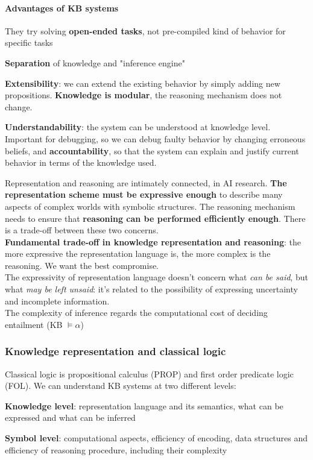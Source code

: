 \documentclass[10pt]{report}
\begin{document}
\paragraph{Advantages of KB systems}
\begin{list}{}{}
	\item They try solving \textbf{open-ended tasks}, not pre-compiled kind of behavior for specific tasks
	\item \textbf{Separation} of knowledge and "inference engine"
	\item \textbf{Extensibility}: we can extend the existing behavior by simply adding new propositions. \textbf{Knowledge is modular}, the reasoning mechanism does not change.
	\item \textbf{Understandability}: the system can be understood at knowledge level. Important for debugging, so we can debug faulty behavior by changing erroneous beliefs, and \textbf{accountability}, so that the system can explain and justify current behavior in terms of the knowledge used.
\end{list}
Representation and reasoning are intimately connected, in AI research. \textbf{The representation scheme must be expressive enough} to describe many aspects of complex worlds with symbolic structures. The reasoning mechanism needs to ensure that \textbf{reasoning can be performed efficiently enough}. There is a trade-off between these two concerns.\\
\textbf{Fundamental trade-off in knowledge representation and reasoning}: the more expressive the representation language is, the more complex is the reasoning. We want the best compromise.\\
The expressivity of representation language doesn't concern what \textit{can be said}, but what \textit{may be left unsaid}: it's related to the possibility of expressing uncertainty and incomplete information.\\
The complexity of inference regards the computational cost of deciding entailment (KB $\vDash \alpha$)
\subsubsection{Knowledge representation and classical logic}
Classical logic is propositional calculus (PROP) and first order predicate logic (FOL). We can understand KB systems at two different levels:
\begin{list}{}{}
	\item \textbf{Knowledge level}: representation language and its semantics, what can be expressed and what can be inferred
	\item \textbf{Symbol level}: computational aspects, efficiency of encoding, data structures and efficiency of reasoning procedure, including their complexity
\end{list}
\end{document}
